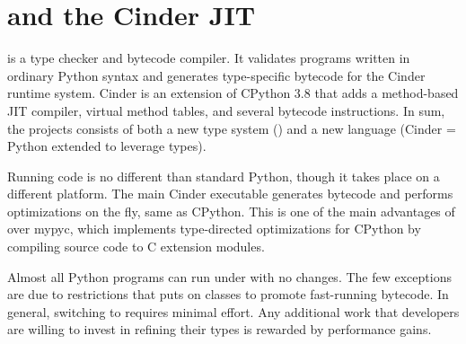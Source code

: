 \documentclass[a4paper,english,cleveref,autoref,thm-restate,anonymous,]{lipics-v2021}
\begin{document}
\section{\SP{} and the Cinder JIT}
\label{s:tour}


\SP{} is a type checker and bytecode compiler.
It validates programs written in ordinary Python syntax
and generates type-specific bytecode for the Cinder runtime system.
Cinder is an extension of CPython 3.8 that adds a method-based
JIT compiler, virtual method tables, and several bytecode instructions.
In sum, the projects consists of both a new type system (\SP{})
and a new language (Cinder = Python extended to leverage types).

Running \SP{} code is no different than standard Python,
though it takes place on a different platform.
The main Cinder executable generates bytecode and performs
optimizations on the fly, same as CPython.
This is one of the main advantages of \SP{} over mypyc,
which implements type-directed optimizations for CPython
by compiling source code to C extension modules.

Almost all Python programs can run under \SP{} with no changes.
The few exceptions are due to restrictions that \SP{} puts
on classes to promote fast-running bytecode.
In general, switching to \SP{} requires minimal effort.
Any additional work that developers are willing to invest
in refining their types is rewarded by performance gains.
\end{document}
